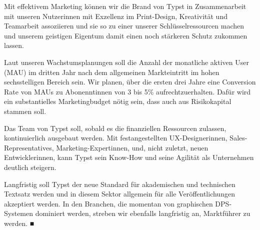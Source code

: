 \documentclass[11pt, a4paper]{article}
\newcommand{\gender}{\raisebox{-.25em}{*}}
\begin{document}
Mit effektivem Marketing können wir die Brand von Typst in Zusammenarbeit mit unseren Nutzer\gender{}innen mit Exzellenz im Print-Design, Kreativität und Teamarbeit assoziieren und sie so zu einer unserer Schlüsselressourcen machen und unserem geistigen Eigentum damit einen noch stärkeren Schutz zukommen lassen.

Laut unseren Wachstumsplanungen soll die Anzahl der monatliche aktiven User (MAU) im dritten Jahr nach dem allgemeinen Markteintritt im hohen sechsstelligen Bereich sein. Wir planen, über die ersten drei Jahre eine Conversion Rate von MAUs zu Abonennt\gender{}innen von 3 bis 5\% aufrechtzuerhalten. Dafür wird ein substantielles Marketingbudget nötig sein, dass auch aus Risikokapital stammen soll.

Das Team von Typst soll, sobald es die finanziellen Ressourcen zulassen, kontinuierlich ausgebaut werden. Mit festangestellten UX-Designer\gender{}innen, Sales-Representatives, Marketing-Expert\gender{}innen, und, nicht zuletzt, neuen Entwickler\gender{}innen, kann Typst sein Know-How und seine Agilität als Unternehmen deutlich steigern.

Langfristig soll Typst der neue Standard für akademischen und technischen Textsatz werden und in diesem Sektor allgemein für alle Veröffentlichungen akzeptiert werden. In den Branchen, die momentan von graphischen DPS-Systemen dominiert werden, streben wir ebenfalls langfristig an, Marktführer zu werden. \hfill {\color{eastern} ■}
\end{document}
